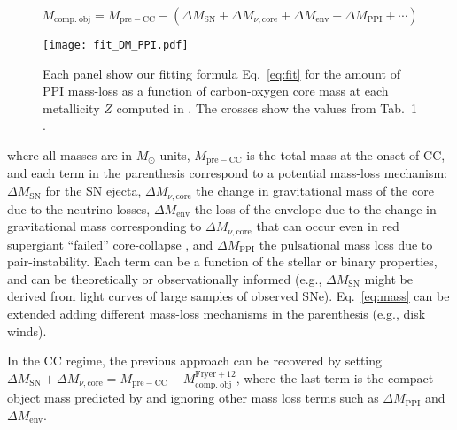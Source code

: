 \documentclass[twocolumn]{aastex63}
\DeclareRobustCommand{\Eqref}[1]{Eq.~\ref{#1}}
\begin{document}
\begin{widetext}
  \begin{equation}
    \label{eq:mass}
    M_\mathrm{comp.\ obj} = M_\mathrm{pre-CC} - \left(\Delta M_\mathrm{SN} + \Delta M_{\nu, \mathrm{core}} + \Delta M_\mathrm{env} + \Delta M_\mathrm{PPI} + \cdots \right)
  \end{equation}
\end{widetext}

\begin{figure}[ht!]
    \begin{centering}
      \texttt{[image: fit\_DM\_PPI.pdf]}
      \caption{Each panel show our fitting formula \Eqref{eq:fit} for
        the amount of PPI mass-loss as a function of carbon-oxygen
        core mass at each metallicity $Z$ computed in
        \cite{farmer:19}. The crosses show the values from Tab.~1
        \cite{farmer:19}.}
        \label{fig:fit_DM_PPI}
    \end{centering}
\end{figure}

where all masses are in $M_\odot$ units, $M_\mathrm{pre-CC}$ is the
total mass at the onset of CC, and each term in the parenthesis
correspond to a potential mass-loss mechanism: $\Delta M_\mathrm{SN}$
for the SN ejecta, $\Delta M_{\nu, \mathrm{core}}$ the change in
gravitational mass of the core due to the neutrino losses,
$\Delta M_\mathrm{env}$ the loss of the envelope due to the change in
gravitational mass corresponding to $\Delta M_{\nu, \mathrm{core}}$
that can occur even in red supergiant ``failed'' core-collapse
\citep{nadezhin:80, lovegrove:13, piro:13, fernandez:18, ivanov:21},
and $\Delta M_\mathrm{PPI}$ the pulsational mass loss due to
pair-instability. Each term can be a function of the stellar or binary
properties, and can be theoretically or observationally informed
(e.g., $\Delta M_\mathrm{SN}$ might be derived from light curves of
large samples of observed SNe). \Eqref{eq:mass} can be extended
adding different mass-loss mechanisms in the parenthesis (e.g., disk
winds).

In the CC regime, the previous approach can be recovered by setting
$\Delta M_\mathrm{SN} + \Delta M_{\nu, \mathrm{core}} = M_\mathrm{pre-CC} - M_\mathrm{comp.\ obj}^\mathrm{Fryer+12}$,
where the last term is the compact object mass predicted by
\cite{fryer:12} and ignoring other mass loss terms
such as $\Delta M_\mathrm{PPI}$ and $\Delta M_\mathrm{env}$.
\end{document}
